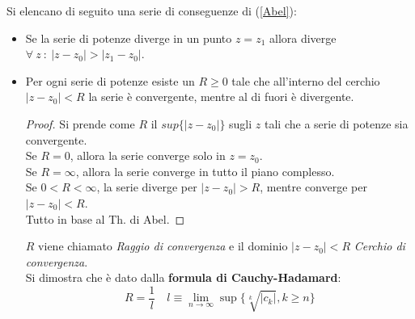\documentclass[twoside]{article}
\begin{document}
Si elencano di seguito una serie di conseguenze di (\ref{Abel}):
\begin{itemize}
    \item Se la serie di potenze diverge in un punto $z=z_1$ allora diverge $\forall \ z \ : \ |z-z_0|>|z_1-z_0|$.
    \item Per ogni serie di potenze esiste un $R\geq 0$ tale che all'interno del cerchio $|z-z_0|<R$ la serie è convergente, mentre al di fuori è divergente.
    \begin{proof}
    Si prende come $R$ il $sup\{|z-z_0|\}$ sugli $z$ tali che a serie di potenze sia convergente.
    \\
    Se $R=0$, allora la serie converge solo in $z=z_0$.
    \\
    Se $R=\infty$, allora la serie converge in tutto il piano complesso.
    \\
    Se $0<R<\infty$, la serie diverge per $|z-z_0|>R$, mentre converge per $|z-z_0|<R$.
    \\
    Tutto in base al Th. di Abel.
    \end{proof}
    $R$ viene chiamato \textit{Raggio di convergenza} e il dominio $|z-z_0|<R$ \textit{Cerchio di convergenza}.\\
    Si dimostra che è dato dalla \textbf{formula di Cauchy-Hadamard}:
    \begin{equation}
        R=\frac{1}{l}\quad l\equiv \lim_{n\to\infty}\sup\{\sqrt[k]{|c_k|},k\ge n\}
    \end{equation}
    

\end{itemize}
\end{document}
